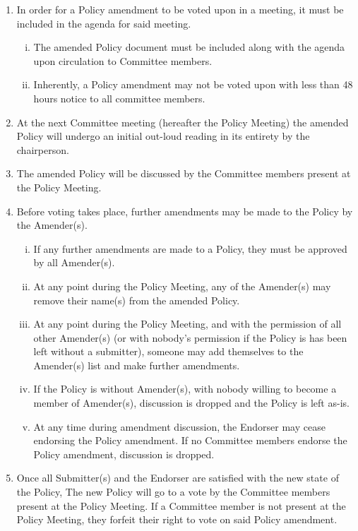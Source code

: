 \documentclass[a4paper,12pt]{article}
\begin{document}
\begin{enumerate}[1)]
    \item In order for a Policy amendment to be voted upon in a meeting, it must be included in the agenda for said meeting.
    \begin{enumerate}[i)]
        \item The amended Policy document must be included along with the agenda upon circulation to Committee members.
        \item Inherently, a Policy amendment may not be voted upon with less than 48 hours notice to all committee members.
    \end{enumerate}
    \item At the next Committee meeting (hereafter the Policy Meeting) the amended Policy will undergo an initial out-loud reading in its entirety by the chairperson.
    \item The amended Policy will be discussed by the Committee members present at the Policy Meeting.
    \item Before voting takes place, further amendments may be made to the Policy by the Amender(s).
    \begin{enumerate}[i)]
        \item If any further amendments are made to a Policy, they must be approved by all Amender(s).
        \item At any point during the Policy Meeting, any of the Amender(s) may remove their name(s) from the amended Policy.
        \item At any point during the Policy Meeting, and with the permission of all other Amender(s) (or with nobody's permission if the Policy is has been left without a submitter), someone may add themselves to the Amender(s) list and make further amendments.
        \item If the Policy is without Amender(s), with nobody willing to become a member of Amender(s), discussion is dropped and the Policy is left as-is.
        \item At any time during amendment discussion, the Endorser may cease endorsing the Policy amendment. If no Committee members endorse the Policy amendment, discussion is dropped.
    \end{enumerate}
    \item Once all Submitter(s) and the Endorser are satisfied with the new state of the Policy, The new Policy will go to a vote by the Committee members present at the Policy Meeting. If a Committee member is not present at the Policy Meeting, they forfeit their right to vote on said Policy amendment.

\end{enumerate}
\end{document}
